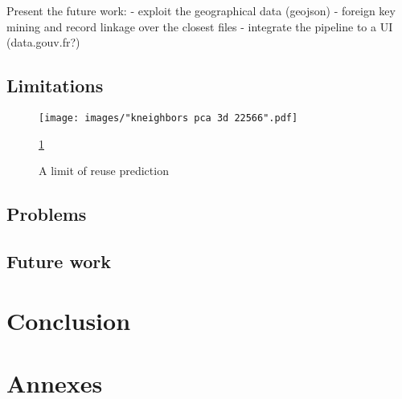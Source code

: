 \documentclass[a4paper]{article}
\begin{document}
	Present the future work:
	- exploit the geographical data (geojson)
	- foreign key mining and record linkage over the closest files
	- integrate the pipeline to a UI (data.gouv.fr?)
	
	\subsection{Limitations}
	
	\begin{figure}[]
		\texttt{[image: images/"kneighbors pca 3d 22566".pdf]}
		\caption{A limit of reuse prediction}
		\label{fig:pca aide}
		\ref{fig:pca aide}
	\end{figure}
	
	
	
	\subsection{Problems}
	
	
	\subsection{Future work}

	\section{Conclusion}	
	
	
	
	
	
	\section{Annexes}
	
	
	
\end{document}
